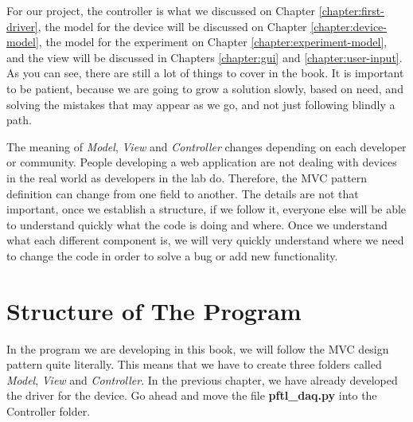 For our project, the controller is what we discussed on Chapter \ref{chapter:first-driver}, the model for the device will be discussed on Chapter \ref{chapter:device-model}, the model for the experiment on Chapter \ref{chapter:experiment-model}, and the view will be discussed in Chapters \ref{chapter:gui} and \ref{chapter:user-input}. As you can see, there are still a lot of things to cover in the book. It is important to be patient, because we are going to grow a solution slowly, based on need, and solving the mistakes that may appear as we go, and not just following blindly a path. 


The meaning of \emph{Model}, \emph{View} and \emph{Controller} changes depending on each developer or community. People developing a web application are not dealing with devices in the real world as developers in the lab do. Therefore, the {MVC} pattern definition can change from one field to another. The details are not that important, once we establish a structure, if we follow it, everyone else will be able to understand quickly what the code is doing and where. Once we understand what each different component is, we will very quickly understand where we need to change the code in order to solve a bug or add new functionality. 

\section{Structure of The Program}\label{section:structure-of-theprogram}
In the program we are developing in this book, we will follow the MVC design pattern quite literally. This means that we have to create three folders called \emph{Model}, \emph{View} and \emph{Controller}. In the previous chapter, we have already developed the driver for the device. Go ahead and move the file \textbf{pftl\_daq.py} into the Controller folder. 

